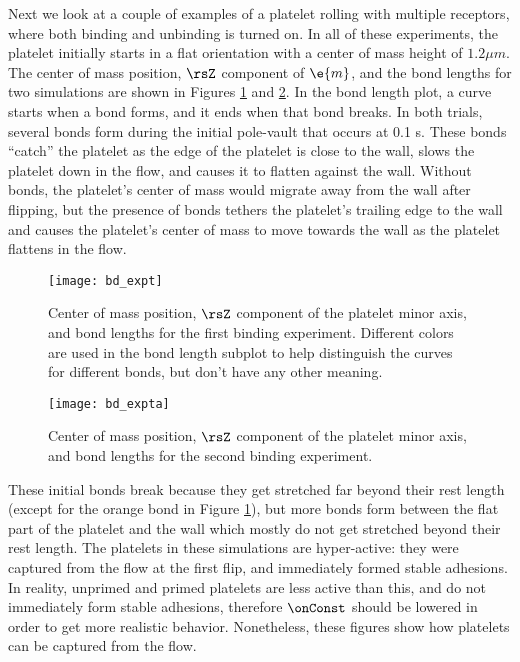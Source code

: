 Next we look at a couple of examples of a platelet rolling with
multiple receptors, where both binding and unbinding is turned on. In
all of these experiments, the platelet initially starts in a flat
orientation with a center of mass height of $1.2 \mu m$. %
The center of mass position, $\rsZ$ component of $\e{m}$, and the bond
lengths for two simulations are shown in Figures \ref{fig:bd-expt0}
and \ref{fig:bd-expta}. In the bond length plot, a curve starts when a
bond forms, and it ends when that bond breaks. In both trials, several
bonds form during the initial pole-vault that occurs at 0.1 s. These bonds
``catch'' the platelet as the edge of the platelet is close to the
wall, slows the platelet down in the flow, and causes it to flatten
against the wall. Without bonds, the platelet's center of mass would
migrate away from the wall after flipping, but the presence of bonds
tethers the platelet's trailing edge to the wall and causes the
platelet's center of mass to move towards the wall as the platelet
flattens in the flow.

\begin{figure}
  \centering
  \texttt{[image: bd\_expt]}
  \caption[Binding experiment \#1]{Center of mass position, $\rsZ$
    component of the platelet minor axis, and bond lengths for the
    first binding experiment. Different colors are used in the bond
    length subplot to help distinguish the curves for different bonds,
    but don't have any other meaning.}
  \label{fig:bd-expt0}
\end{figure}

\begin{figure}
  \centering
  \texttt{[image: bd\_expta]}
  \caption[Binding experiment \#2]{Center of mass position, $\rsZ$
    component of the platelet minor axis, and bond lengths for the
    second binding experiment.}
  \label{fig:bd-expta}
\end{figure}

These initial bonds break because they get stretched far beyond their
rest length (except for the orange bond in Figure \ref{fig:bd-expt0}),
but more bonds form between the flat part of the platelet and the wall
which mostly do not get stretched beyond their rest length. The
platelets in these simulations are hyper-active: they were captured
from the flow at the first flip, and immediately formed stable
adhesions. In reality, unprimed and primed platelets are less active
than this, and do not immediately form stable adhesions, therefore
$\onConst$ should be lowered in order to get more realistic
behavior. Nonetheless, these figures show how platelets can be
captured from the flow.

